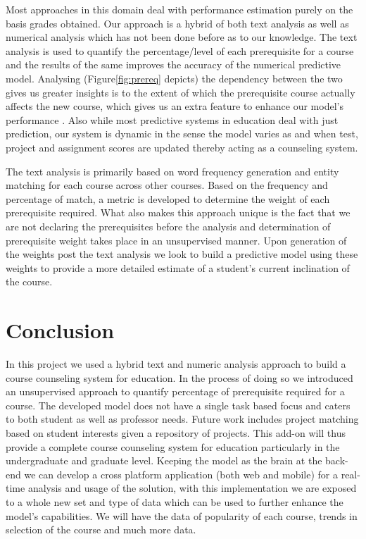 \documentclass[conference]{IEEEtran}
\begin{document}
Most approaches in this domain deal with performance estimation purely on the basis grades obtained. Our approach is a hybrid of both text analysis as well as numerical analysis which has not been done before as to our knowledge. The text analysis is used to quantify the percentage/level of each prerequisite for a course and the results of the same improves the accuracy of the numerical predictive model. Analysing (Figure\ref{fig:prereq} depicts) the dependency between the two gives us greater insights is to the extent of which the prerequisite course actually affects the new course, which gives us an extra feature to enhance our model's performance . Also while most predictive systems in education deal with just prediction, our system is dynamic in the sense the model varies as and when test, project and assignment scores are updated thereby acting as a counseling system.

The text analysis is primarily based on word frequency generation and entity matching for each course across other courses. Based on the frequency and percentage of match, a metric is developed to determine the weight of each prerequisite required. What also makes this approach unique is the fact that we are not declaring the prerequisites before the analysis and determination of prerequisite weight takes place in an unsupervised manner. Upon generation of the weights post the text analysis we look to build a predictive model using these weights to provide a more detailed estimate of a student's current inclination of the course.

	\section{Conclusion}
In this project we used a hybrid text and numeric analysis approach to build a course counseling system for education. In the process of doing so we introduced an unsupervised approach to quantify percentage of prerequisite required for a course. The developed model does not have a single task based focus and caters to both student as well as professor needs. Future work includes project matching based on student interests given a repository of projects. This add-on will thus provide a complete course counseling system for education particularly in the undergraduate and graduate level. Keeping the model as the brain at the back-end we can develop a cross platform application (both web and mobile) for a real-time analysis and usage of the solution, with this implementation we are exposed to a whole new set and type of data which can be used to further enhance the model's capabilities. We will have the data of popularity of each course, trends in selection of the course and much more data.
\end{document}
